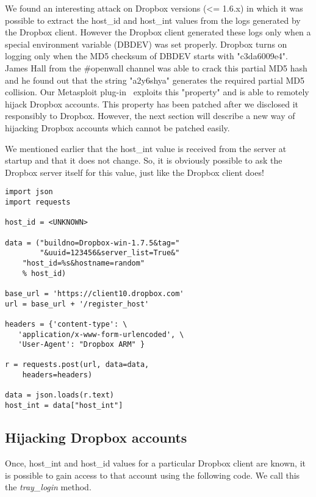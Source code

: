 \documentclass[letterpaper,twocolumn,10pt]{article}
\begin{document}
We found an interesting attack on Dropbox versions (<= 1.6.x) in which it was
possible to extract the host\_id and host\_int values from the logs generated
by the Dropbox client. However the Dropbox client generated these logs only when
a special environment variable (DBDEV) was set properly. Dropbox turns on logging
only when the MD5 checksum of DBDEV starts with "c3da6009e4". James Hall from the
\#openwall channel was able to crack this partial MD5 hash and he found out that the
string "a2y6shya" generates the required partial MD5 collision. Our Metasploit
plug-in~\cite{metasploit} exploits this "property" and is able to remotely
hijack Dropbox accounts. This property has been patched after we disclosed
it responsibly to Dropbox. However, the next section will describe a new way
of hijacking Dropbox accounts which cannot be patched easily.

We mentioned earlier that the host\_int value is received from the server at
startup and that it does not change. So, it is obviously possible to ask the
Dropbox server itself for this value, just like the Dropbox client does!

\begin{verbatim}
import json
import requests

host_id = <UNKNOWN>

data = ("buildno=Dropbox-win-1.7.5&tag="
        "&uuid=123456&server_list=True&"
	"host_id=%s&hostname=random"
	% host_id)

base_url = 'https://client10.dropbox.com'
url = base_url + '/register_host'

headers = {'content-type': \
   'application/x-www-form-urlencoded', \
   'User-Agent': "Dropbox ARM" }

r = requests.post(url, data=data,
    headers=headers)

data = json.loads(r.text)
host_int = data["host_int"]
\end{verbatim}

\subsection{Hijacking Dropbox accounts}

Once, host\_int and host\_id values for a particular Dropbox client are known,
it is possible to gain access to that account using the following code. We call
this the \emph{tray\_login} method.

\vspace{15mm}
\end{document}

